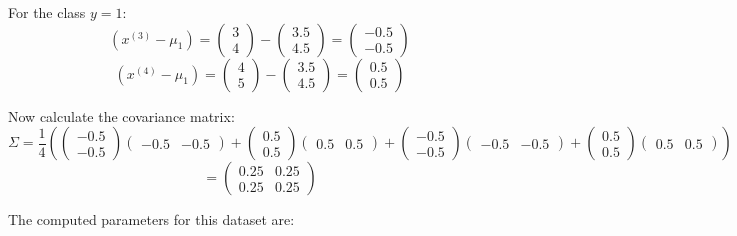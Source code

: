 \documentclass[12pt]{article}
\begin{document}
\begin{itemize}
    For the class $y = 1$:
    \[
    (x^{(3)} - \mu_1) = \begin{pmatrix} 3 \\ 4 \end{pmatrix} - \begin{pmatrix} 3.5 \\ 4.5 \end{pmatrix} = \begin{pmatrix} -0.5 \\ -0.5 \end{pmatrix}
    \]
    \[
    (x^{(4)} - \mu_1) = \begin{pmatrix} 4 \\ 5 \end{pmatrix} - \begin{pmatrix} 3.5 \\ 4.5 \end{pmatrix} = \begin{pmatrix} 0.5 \\ 0.5 \end{pmatrix}
    \]

    Now calculate the covariance matrix:
    \[
    \Sigma = \frac{1}{4} \left( \begin{pmatrix} -0.5 \\ -0.5 \end{pmatrix} \begin{pmatrix} -0.5 & -0.5 \end{pmatrix} + \begin{pmatrix} 0.5 \\ 0.5 \end{pmatrix} \begin{pmatrix} 0.5 & 0.5 \end{pmatrix} + \begin{pmatrix} -0.5 \\ -0.5 \end{pmatrix} \begin{pmatrix} -0.5 & -0.5 \end{pmatrix} + \begin{pmatrix} 0.5 \\ 0.5 \end{pmatrix} \begin{pmatrix} 0.5 & 0.5 \end{pmatrix} \right)
    \]
    \[
    = \begin{pmatrix} 0.25 & 0.25 \\ 0.25 & 0.25 \end{pmatrix}
    \]
\end{itemize}
The computed parameters for this dataset are:
\end{document}
